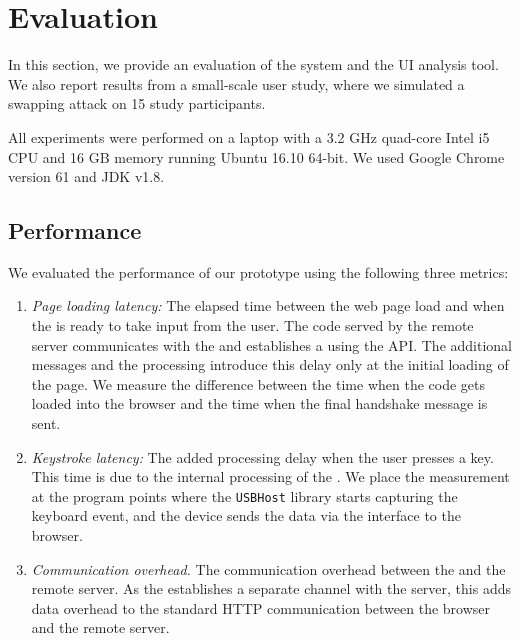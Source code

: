 
\section{Evaluation}
\label{sec:results}

In this section, we provide an evaluation of the \name system and the \tool UI analysis tool. We also report results from a small-scale user study, where we simulated a swapping attack on 15 study participants.

 All experiments were performed on a laptop with a 3.2 GHz quad-core Intel i5 CPU and 16 GB memory running Ubuntu 16.10 64-bit. We used Google Chrome version 61 and JDK v1.8.

\subsection{\name Performance}
\label{sec:results:devicePerformance}

We evaluated the performance of our \device prototype using the following three metrics:

\begin{enumerate}
  \item \emph{Page loading latency:} The elapsed time between the web page load and when the \device is ready to take input from the user. The \js code served by the remote server communicates with the \device and establishes a \tls using the \webusb API. The additional \tls messages and the \device processing introduce this delay only at the initial loading of the page. We measure the difference between the time when the \js code gets loaded into the browser and the time when the final \tls handshake message is sent.
  
  \item \emph{Keystroke latency:} The added processing delay when the user presses a key. This time is due to the internal processing of the \device. We place the measurement at the program points where the \texttt{USBHost} library starts capturing the keyboard event, and the device sends the data via the \webusb interface to the browser.
  
  \item \emph{Communication overhead.} The communication overhead between the \device and the remote server. As the \device establishes a separate \tls channel with the server, this adds data overhead to the standard HTTP communication between the browser and the remote server.
\end{enumerate}

